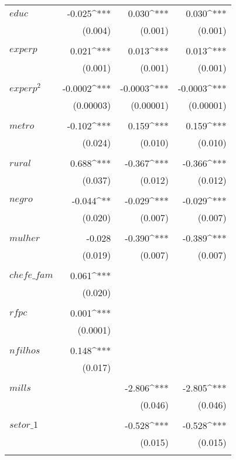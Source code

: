 \begin{apendicesenv}
\begin{longtable}{@{\extracolsep{5pt}}lD{.}{.}{-3} D{.}{.}{-3} D{.}{.}{-3} }
	   $educ$       & -0.025^{***} & 0.030^{***} & 0.030^{***} \\ 
		            & (0.004) & (0.001) & (0.001) \\ 
		            & & & \\ 
	   $experp$ & 0.021^{***} & 0.013^{***} & 0.013^{***} \\ 
		& (0.001) & (0.001) & (0.001) \\ 
		& & & \\ 
		$experp^{2}$ & -0.0002^{***} & -0.0003^{***} & -0.0003^{***} \\ 
		& (0.00003) & (0.00001) & (0.00001) \\ 
		& & & \\ 
	   $metro$ & -0.102^{***} & 0.159^{***} & 0.159^{***} \\ 
		& (0.024) & (0.010) & (0.010) \\ 
		& & & \\ 
	   $rural$ & 0.688^{***} & -0.367^{***} & -0.366^{***} \\ 
		& (0.037) & (0.012) & (0.012) \\ 
		& & & \\ 
	   $negro$ & -0.044^{**} & -0.029^{***} & -0.029^{***} \\ 
		& (0.020) & (0.007) & (0.007) \\ 
		& & & \\ 
	   $mulher$ & -0.028 & -0.390^{***} & -0.389^{***} \\ 
		& (0.019) & (0.007) & (0.007) \\ 
		& & & \\ 
	   $chefe\_fam$ & 0.061^{***} &  &  \\ 
		& (0.020) &  &  \\ 
		& & & \\ 
	   $rfpc$ & 0.001^{***} &  &  \\ 
		& (0.0001) &  &  \\ 
		& & & \\ 
	   $nfilhos$ & 0.148^{***} &  &  \\ 
		& (0.017) &  &  \\ 
		& & & \\ 
	   $mills$ &  & -2.806^{***} & -2.805^{***} \\ 
		&  & (0.046) & (0.046) \\ 
		& & & \\ 
	   $setor\_1$ &  & -0.528^{***} & -0.528^{***} \\ 
		&  & (0.015) & (0.015) \\ 
		& & & \\ 

\end{longtable}
\end{apendicesenv}
